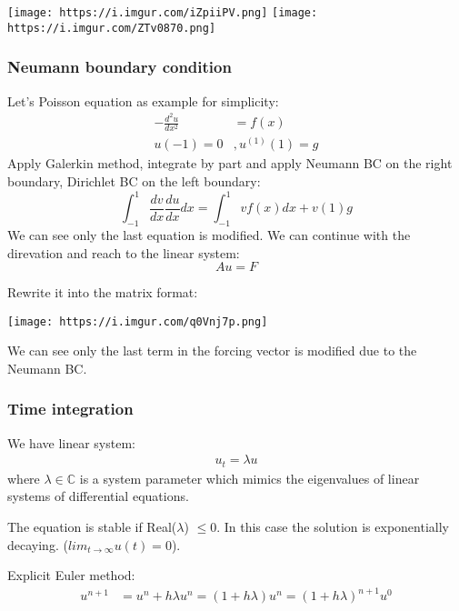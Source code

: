 \documentclass[
  a4paper,
  10pt]{article}
\begin{document}
\texttt{[image: https://i.imgur.com/iZpiiPV.png]}
\texttt{[image: https://i.imgur.com/ZTv0870.png]}

\hypertarget{neumann-boundary-condition}{%
\subsubsection{Neumann boundary
condition}\label{neumann-boundary-condition}}

Let's Poisson equation as example for simplicity: \begin{align}
-\frac{d^2u}{dx^2} &= f(x)\\
u(-1) = 0&,u^{(1)}(1)=g
\end{align} Apply Galerkin method, integrate by part and apply Neumann
BC on the right boundary, Dirichlet BC on the left boundary:
\begin{equation}
\int_{-1}^1\frac{dv}{dx}\frac{du}{dx}dx = \int_{-1}^1 vf(x)dx+v(1)g
\end{equation} We can see only the last equation is modified. We can
continue with the direvation and reach to the linear system:
\begin{equation}
Au=F
\end{equation}

Rewrite it into the matrix format:

\texttt{[image: https://i.imgur.com/q0Vnj7p.png]}

We can see only the last term in the forcing vector is modified due to
the Neumann BC.

\hypertarget{time-integration}{%
\subsubsection{Time integration}\label{time-integration}}

We have linear system: \begin{align}
u_t = \lambda u
\end{align} where \(\lambda\in\mathbb{C}\) is a system parameter which
mimics the eigenvalues of linear systems of differential equations.

The equation is stable if Real(\(\lambda\)) \(\leq 0\). In this case the
solution is exponentially decaying. (\(lim_{t\to\infty}u(t) = 0\)).

Explicit Euler method: \begin{align}
u^{n+1} &= u^{n} + h\lambda u^{n}
=(1+h\lambda)u^{n}
=(1+h\lambda)^{n+1}u^0
\end{align}
\end{document}
